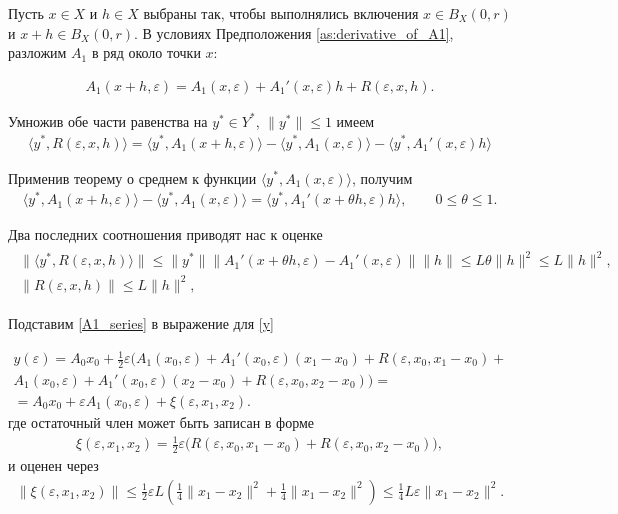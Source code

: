 \documentclass[../main.tex]{subfiles}
\begin{document}
Пусть $x \in X$ и $h \in X$ выбраны так, чтобы выполнялись включения $x\in B_X(0, r)$ и $x+h \in B_X(0, r)$.
В условиях Предположения \ref{as:derivative_of_A1}, разложим $A_1$ в ряд около точки $x$:

\begin{gather}\label{A1_series}
	A_1(x + h,\varepsilon) = A_1(x,\varepsilon) + A_1'(x,\varepsilon) h + R(\varepsilon, x, h).
\end{gather}

Умножив обе части равенства на $y^* \in Y^*$, $\|y^*\| \leqslant 1$ имеем
\begin{gather*}
	\langle y^*, R(\varepsilon, x, h) \rangle = 
	\langle y^*, A_1(x + h,\varepsilon) \rangle -
	\langle y^*, A_1(x,\varepsilon) \rangle -
	\langle y^*, A_1'(x,\varepsilon) h \rangle
\end{gather*}

Применив теорему о среднем к функции $\langle y^*, A_1(x,\varepsilon) \rangle$, получим
\begin{gather*}
	\langle y^*, A_1(x + h,\varepsilon) \rangle -
	\langle y^*, A_1(x,\varepsilon) \rangle = 
	\langle y^*, A_1'(x + \theta h,\varepsilon) h \rangle,
	\qquad
	0 \leqslant \theta \leqslant 1.
\end{gather*}

Два последних соотношения приводят нас к оценке
\begin{gather}
	\begin{gathered}
		\|\langle y^*, R(\varepsilon, x, h) \rangle \| \leqslant
		\| y^* \| 
		\| A_1'(x + \theta h,\varepsilon)  -
		A_1'(x,\varepsilon) \| 
		\| h  \| \leqslant 
		L \theta \|h\|^2 \leqslant
		L \|h\|^2, \\
		\| R(\varepsilon, x, h) \| \leqslant
		L \|h\|^2, 
	\end{gathered}
\end{gather}

Подставим \eqref{A1_series} в выражение для \eqref{y}

\begin{gather*}
	y(\varepsilon) =
	A_0x_0 +
	\frac{1}{2}\varepsilon \Big(
	A_1(x_0,\varepsilon) +
	A_1'(x_0,\varepsilon)(x_1 - x_0)+ 
	R(\varepsilon, x_0, x_1 - x_0) + \\ 
	A_1(x_0,\varepsilon) +
	A_1'(x_0,\varepsilon)(x_2 - x_0)+ 
	R(\varepsilon, x_0, x_2 - x_0)
	\Big) = \\ = 
	A_0x_0 + 
	\varepsilon A_1(x_0,\varepsilon) +
	\xi(\varepsilon,x_1,x_2).
\end{gather*}
где остаточный член может быть записан в форме
\begin{gather*}
	\xi(\varepsilon,x_1,x_2) = \frac{1}{2}\varepsilon\big(R(\varepsilon, x_0, x_1 - x_0) + R(\varepsilon, x_0, x_2 - x_0)\big),
\end{gather*}
и оценен через
\begin{gather*}
	\|\xi(\varepsilon,x_1,x_2)\| \leqslant \frac{1}{2}\varepsilon L \left(\frac{1}{4}\|x_1 - x_2\|^2 + \frac{1}{4}\|x_1 - x_2\|^2 \right) \leqslant \frac{1}{4}L\varepsilon\|x_1 - x_2\|^2.   
\end{gather*}
\end{document}
